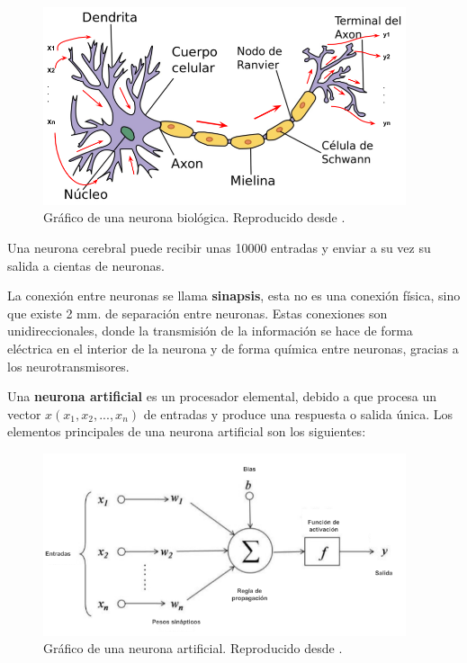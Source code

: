  \begin{figure}[h!]
  \begin{center}	\includegraphics[width=0.95\textwidth, frame]{imagenes/Cap4/neurona}
  \caption{Gr\'{a}fico de una neurona biol\'{o}gica. Reproducido desde \protect\cite{Reference67}.}
  \label{fig:neurona_real}
  \end{center}
\end{figure}

Una neurona cerebral puede recibir unas 10000 entradas y enviar a su vez su salida a cientas de neuronas.

\vspace{5mm} %

La conexi\'{o}n entre neuronas se llama \textbf{sinapsis}, esta no es una conexi\'{o}n f\'{i}sica, sino que existe 2 mm. de separaci\'{o}n entre neuronas. Estas conexiones son unidireccionales, donde la transmisi\'{o}n de la informaci\'{o}n se hace de forma el\'{e}ctrica en el interior de la neurona  y de forma qu\'{i}mica entre neuronas, gracias a los neurotransmisores.

\vspace{5mm} %

Una \textbf{neurona artificial} es un procesador elemental, debido a que procesa un vector $x(x_{1},x_{2}, ... ,x_{n})$ de entradas y produce una respuesta o salida \'{u}nica. Los elementos principales de una neurona artificial son los siguientes:

\begin{figure}[h!]
  \begin{center}	\includegraphics[width=0.95\textwidth, frame]{imagenes/Cap4/neurona_artificial}
  \caption{Gr\'{a}fico de una neurona artificial. Reproducido desde \protect\cite{Reference68}.}
  \label{fig:neurona}
  \end{center}
\end{figure}

